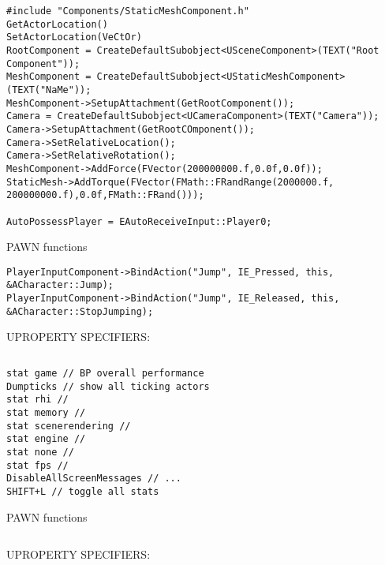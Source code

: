 \newpage

\begin{landscape}
        \begin{tcolorbox}[title=Useful Actor Functions, colframe=violet!95, colback=violet!45, center title]
            \begin{multicols}{2}
            \begin{lstlisting}
#include "Components/StaticMeshComponent.h"
GetActorLocation()
SetActorLocation(VeCtOr)
RootComponent = CreateDefaultSubobject<USceneComponent>(TEXT("Root Component"));
MeshComponent = CreateDefaultSubobject<UStaticMeshComponent>(TEXT("NaMe"));
MeshComponent->SetupAttachment(GetRootComponent());
Camera = CreateDefaultSubobject<UCameraComponent>(TEXT("Camera"));
Camera->SetupAttachment(GetRootCOmponent());
Camera->SetRelativeLocation();
Camera->SetRelativeRotation();
MeshComponent->AddForce(FVector(200000000.f,0.0f,0.0f));
StaticMesh->AddTorque(FVector(FMath::FRandRange(2000000.f, 200000000.f),0.0f,FMath::FRand()));

AutoPossessPlayer = EAutoReceiveInput::Player0;
            \end{lstlisting}
            PAWN functions
            \begin{lstlisting}
PlayerInputComponent->BindAction("Jump", IE_Pressed, this, &ACharacter::Jump);
PlayerInputComponent->BindAction("Jump", IE_Released, this, &ACharacter::StopJumping);

            \end{lstlisting}
            UPROPERTY SPECIFIERS:
            \begin{lstlisting}

            \end{lstlisting}
        \end{multicols}
        \end{tcolorbox}
\end{landscape}


\newpage

\begin{landscape}
        \begin{tcolorbox}[title=Debugging, colframe=violet!95, colback=violet!45, center title]
            \begin{multicols}{2}
            \begin{lstlisting}
stat game // BP overall performance
Dumpticks // show all ticking actors
stat rhi //
stat memory //
stat scenerendering //
stat engine //
stat none //
stat fps //
DisableAllScreenMessages // ...
SHIFT+L // toggle all stats

            \end{lstlisting}
            PAWN functions
            \begin{lstlisting}

            \end{lstlisting}
            UPROPERTY SPECIFIERS:
            \begin{lstlisting}

            \end{lstlisting}
        \end{multicols}
        \end{tcolorbox}
\end{landscape}
